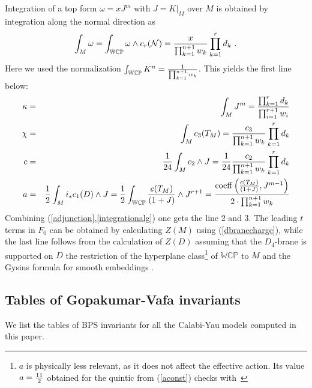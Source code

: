 \documentclass[12pt]{article}
\begin{document}
Integration of a top form $\omega=x J^m$ with $J=K|_M$ over $M$ is obtained by integration
along the normal direction as
\begin{equation}
\int_{M} \omega=\int_{\mathbb{WCP}} \omega \wedge c_r({\cal N}) = {x\over \prod_{k=1}^{n+1} w_k} \prod_{k=1}^r d_k \ .
\label{integrationalg}
\end{equation}
Here we used the normalization  $\int_{\mathbb{WCP}} K^n= {1\over \prod_{k=1}^{n+1} w_k}$.
This  yields the first line below:
\begin{eqnarray}
\kappa&=&\int_{M} J^m={\prod_{k=1}^r d_k\over \prod_{i=1}^{r+1} w_i} \label{kappa}\\
\chi  &=& \int_M c_3(T_M)={c_3\over \prod_{k=1}^{n+1} w_k} \prod_{k=1}^r d_k \label{chi}\\
  c  &=& {1\over 24} \int_M c_2\wedge J={1\over 24} {c_2\over \prod_{k=1}^{n+1} w_k} \prod_{k=1}^r d_k \label{cconst}\\
  a  &=& {1\over 2}  \int_M i_* c_1(D)\wedge J= {1 \over 2}
\int_{\mathbb{WCP}} {c(T_M)\over (1+J)}\wedge J^{r+1}={{\rm coeff} \left({c(T_M)\over (1+J)},J^{m-1}\right)
\over 2\cdot \prod_{k=1}^{n+1} w_k }\label{aconst}
\end{eqnarray}
Combining (\ref{adjunction},\ref{integrationalg}) one gets the line 2
and 3. The leading $t$ terms in $F_0$ can be obtained by
calculating $Z(M)$  using (\ref{dbranecharge}), while the last
line follows from the calculation of $Z(D)$ assuming that the
$D_4$-brane is supported on $D$ the restriction of the hyperplane
class\footnote{$a$ is physically less relevant, as it does not
affect the effective action. Its value $a={11\over 2}$ obtained
for the quintic from  (\ref{aconst}) checks
with~\cite{Candelas:1990rm}} of ${\mathbb{WCP}}$ to $M$ and the Gysins
formula for smooth embeddings \cite{fulton}.

\subsection{Tables of Gopakumar-Vafa invariants}

We list the tables of BPS invariants for all the Calabi-Yau models
computed in this paper.


\end{document}
